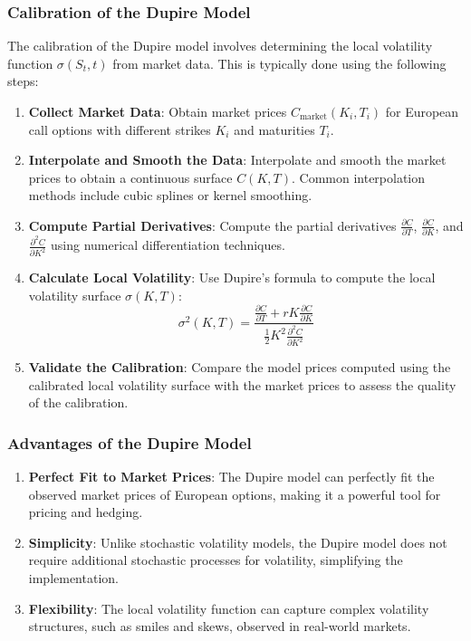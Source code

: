 \documentclass[11pt, oneside, a4paper, titlepage]{report}
\begin{document}
\subsubsection{Calibration of the Dupire Model}

The calibration of the Dupire model involves determining the local volatility function \( \sigma(S_t, t) \) from market data. This is typically done using the following steps:
\begin{enumerate}
    \item \textbf{Collect Market Data}:
    Obtain market prices \( C_{\text{market}}(K_i, T_i) \) for European call options with different strikes \( K_i \) and maturities \( T_i \).
    \item \textbf{Interpolate and Smooth the Data}:
    Interpolate and smooth the market prices to obtain a continuous surface \( C(K, T) \). Common interpolation methods include cubic splines or kernel smoothing.
    \item \textbf{Compute Partial Derivatives}:
    Compute the partial derivatives \( \frac{\partial C}{\partial T} \), \( \frac{\partial C}{\partial K} \), and \( \frac{\partial^2 C}{\partial K^2} \) using numerical differentiation techniques.
    \item \textbf{Calculate Local Volatility}:
    Use Dupire's formula to compute the local volatility surface \( \sigma(K, T) \):
    \[
    \sigma^2(K, T) = \frac{\frac{\partial C}{\partial T} + r K \frac{\partial C}{\partial K}}{\frac{1}{2} K^2 \frac{\partial^2 C}{\partial K^2}}
    \]
    \item \textbf{Validate the Calibration}:
    Compare the model prices computed using the calibrated local volatility surface with the market prices to assess the quality of the calibration.
\end{enumerate}

\subsubsection{Advantages of the Dupire Model}
\begin{enumerate}
    \item \textbf{Perfect Fit to Market Prices}: The Dupire model can perfectly fit the observed market prices of European options, making it a powerful tool for pricing and hedging.
    \item \textbf{Simplicity}: Unlike stochastic volatility models, the Dupire model does not require additional stochastic processes for volatility, simplifying the implementation.
    \item \textbf{Flexibility}: The local volatility function can capture complex volatility structures, such as smiles and skews, observed in real-world markets.
\end{enumerate}
\end{document}
